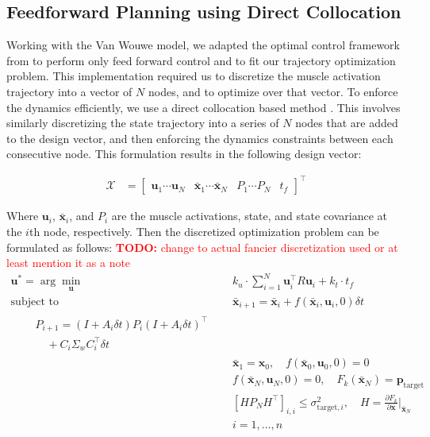 \documentclass[letterpaper, 10pt, conference]{ieeeconf}
\newcommand{\todo}[1]{\textcolor{red}{\textbf{TODO:} #1}}
\begin{document}
\subsection{Feedforward Planning using Direct Collocation}
Working with the Van Wouwe model, we adapted the optimal control framework from \cite{stochastic_model} to perform only feed forward control and to fit our trajectory optimization problem. This implementation required us to discretize the muscle activation trajectory into a vector of $N$ nodes, and to optimize over that vector. To enforce the dynamics efficiently, we use a direct collocation based method \cite{direct_collocation}. This involves similarly discretizing the state trajectory into a series of $N$ nodes that are added to the design vector, and then enforcing the dynamics constraints between each consecutive node. This formulation results in the following design vector:

\begin{align}
    \mathcal{X} &= \begin{bmatrix}
        \mathbf{u}_1  \cdots \mathbf{u}_N & \mathbf{\bar{x}}_1 \cdots \mathbf{\bar{x}}_N & P_1 \cdots P_N & t_f
    \end{bmatrix}^\top
\end{align}

Where $\mathbf{u}_i$, $\mathbf{\bar{x}}_i$, and $P_i$ are the muscle activations, state, and state covariance at the $i$th node, respectively. Then the discretized optimization problem can be formulated as follows:
\todo{change to actual fancier discretization used or at least mention it as a note} \\

\begin{align}
    \mathbf{u}^* = \arg\min_{\mathbf{u}} &\quad k_u \cdot \sum_{i=1}^{N} \mathbf{u}_i^\top R \mathbf{u}_i + k_t \cdot t_f \label{eq:dcost} \\
    \text{subject to} &\quad \mathbf{\bar{x}}_{i+1} = \mathbf{\bar{x}}_i + f(\mathbf{\bar{x}}_i, \mathbf{u}_i, 0) \delta t \\
    \begin{split}
        &\quad P_{i+1} = (I + A_i \delta t)P_i(I + A_i \delta t)^\top \\
        &\quad \quad + C_i \Sigma_w C_i^\top \delta t
    \end{split} \label{test} \\
    &\quad \mathbf{\bar{x}}_1 = \mathbf{x}_0, \quad f(\mathbf{\bar{x}}_0, \mathbf{u}_0, 0) = 0 \\
    &\quad f(\mathbf{\bar{x}}_N, \mathbf{u}_N, 0) = 0, \quad F_k(\mathbf{\bar{x}}_N) = \mathbf{p}_{\text{target}} \label{eq:dtarget_constraint} \\
    &\quad [HP_NH^\top]_{i,i} \leq \sigma_{\text{target}, i}^2, \quad H = \frac{\partial F_k}{\partial \mathbf{x}}\bigg|_{\mathbf{\bar{x}}_N} \\
    &\quad i = 1, \ldots, n \label{eq:dtarget_variance_constraint}
\end{align}
\end{document}
